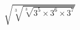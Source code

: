 \documentclass[preview]{standalone}
\begin{document}
\begin{align*}
\sqrt{ \sqrt[3]{\sqrt[3]{3^5 \times 3^6 \times 3^7}}}
\end{align*}
\end{document}
